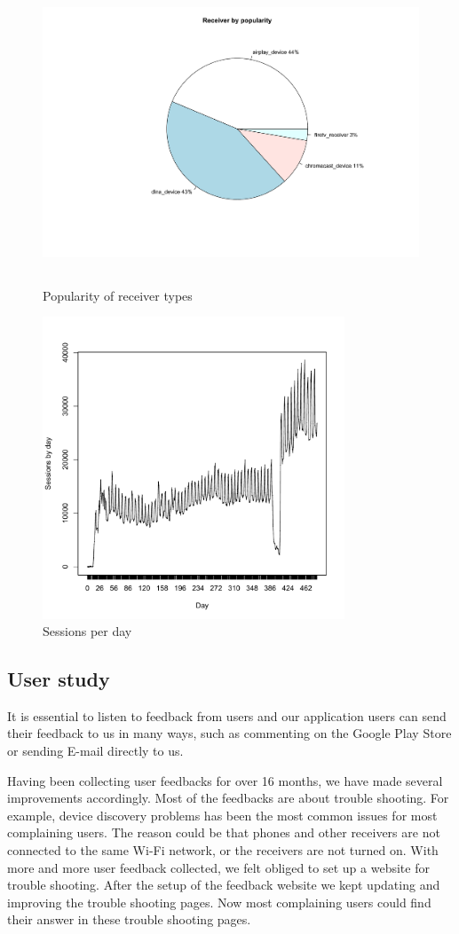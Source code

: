 \begin{figure}[htb]
\centering \includegraphics[height=9cm]{charts/receiver_popularity}
\caption{Popularity of receiver types \label{receiver_types}}
\end{figure}

\begin{figure}[hb]
\centering \includegraphics[height=9cm]{charts/sessions_per_day}
\caption{Sessions per day \label{sessions_perday}}
\end{figure}
\clearpage
\subsection{User study\label{4_3}}
It is essential to listen to feedback from users and our application users can
send their feedback to us in many ways, such as commenting on the Google Play
Store or sending E-mail directly to us.

Having been collecting user feedbacks for over 16 months, we have made several
improvements accordingly. Most of the feedbacks are about trouble shooting. For
example, device discovery problems has been the most common issues for most
complaining users. The reason could be that phones and other receivers are not
connected to the same Wi-Fi network, or the receivers are not turned on. With
more and more user feedback collected, we felt obliged to set up a website for
trouble shooting. After the setup of the feedback website we kept updating and
improving the trouble shooting pages. Now most complaining users could find
their answer in these trouble shooting pages.
